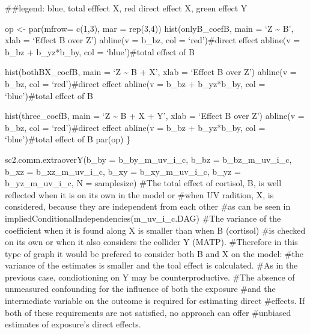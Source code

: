 \documentclass[
]{article}
\begin{document}
\#\#legend: blue, total efffect X, red direct effect X, green effect Y

op \textless- par(mfrow= c(1,3), mar = rep(3,4)) hist(onlyB\_coefB, main
= `Z \textasciitilde{} B', xlab = `Effect B over Z') abline(v = b\_bz,
col = `red')\#direct effect abline(v = b\_bz + b\_yz*b\_by, col =
`blue')\#total effect of B

hist(bothBX\_coefB, main = `Z \textasciitilde{} B + X', xlab = `Effect B
over Z') abline(v = b\_bz, col = `red')\#direct effect abline(v = b\_bz
+ b\_yz*b\_by, col = `blue')\#total effect of B

hist(three\_coefB, main = `Z \textasciitilde{} B + X + Y', xlab =
`Effect B over Z') abline(v = b\_bz, col = `red')\#direct effect
abline(v = b\_bz + b\_yz*b\_by, col = `blue')\#total effect of B par(op)
\}

sc2.comm.extraoverY(b\_by = b\_by\_m\_uv\_i\_c, b\_bz =
b\_bz\_m\_uv\_i\_c, b\_xz = b\_xz\_m\_uv\_i\_c, b\_xy =
b\_xy\_m\_uv\_i\_c, b\_yz = b\_yz\_m\_uv\_i\_c, N = samplesize) \#The
total effect of cortisol, B, is well reflected when it is on its own in
the model or \#when UV radition, X, is considered, because they are
independent from each other \#as can be seen in
impliedConditionalIndependencies(m\_uv\_i\_c.DAG) \#The variance of the
coefficient when it is found along X is smaller than when B (cortisol)
\#is checked on its own or when it also considers the collider Y (MATP).
\#Therefore in this type of graph it would be prefered to consider both
B and X on the model: \#the variance of the estimates is smaller and the
toal effect is calculated. \#As in the previous case, condiotioning on Y
may be counterproductive. \#The absence of unmeasured confounding for
the influence of both the exposure \#and the intermediate variable on
the outcome is required for estimating direct \#effects. If both of
these requirements are not satisfied, no approach can offer \#unbiased
estimates of exposure's direct effects.
\end{document}

